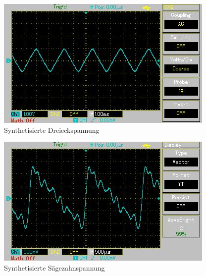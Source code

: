 \begin{figure}[h!]
	\centering
	\includegraphics[scale=0.8]{Grafiken/Dreieckspannung.jpg}
	\caption{Synthetisierte Dreieckspannung}
	\label{fig:Drei}
\end{figure}

\begin{figure}[h!]
	\centering
	\includegraphics[scale=0.8]{Grafiken/Saegezahnspannung.jpg}
	\caption{Synthetisierte Sägezahnspannung}	
	\label{fig:Säge}
\end{figure}
\hspace*{4cm}